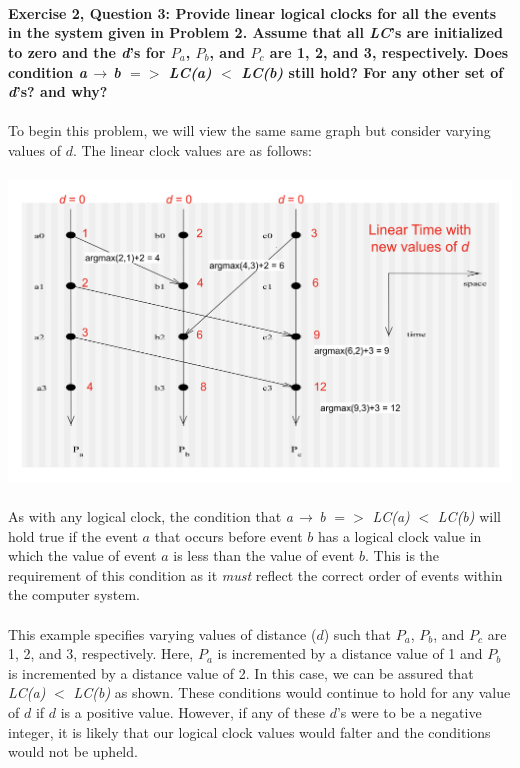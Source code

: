 \documentclass{article}
\begin{document}
\\ \\ \\
\textbf{Exercise 2, Question 3: Provide linear logical clocks for all the events in the system given in Problem 2. Assume that all \textit{LC}'s are initialized to zero and the \textit{d}'s for \textit{$P_a$}, \textit{$P_b$}, and \textit{$P_c$} are 1, 2, and 3, respectively. Does condition \textit{a}$\,\to\,$\textit{b} $=>$ \textit{LC(a)} $<$ \textit{LC(b)} still hold? For any other set of \textit{d}'s? and why?} \\ \\ 
To begin this problem, we will view the same same graph but consider varying values of $d$. The linear clock values are as follows: \\ \\
\includegraphics[width=\textwidth,height=\textheight,keepaspectratio]{new_d.png}\\ \\
As with any logical clock, the condition that \textit{a}$\,\to\,$\textit{b} $=>$ \textit{LC(a)} $<$ \textit{LC(b)} will hold true if the event $a$ that occurs before event $b$ has a logical clock value in which the value of event $a$ is less than the value of event $b$. This is the requirement of this condition as it \textit{must} reflect the correct order of events within the computer system.\\ \\
This example specifies varying values of distance ($d$) such that \textit{$P_a$}, \textit{$P_b$}, and \textit{$P_c$} are 1, 2, and 3, respectively. Here, \textit{$P_a$} is incremented by a distance value of 1 and \textit{$P_b$} is incremented by a distance value of 2. In this case, we can be assured that \textit{LC(a)} $<$ \textit{LC(b)} as shown. These conditions would continue to hold for any value of $d$ if $d$ is a positive value. However, if any of these $d$'s were to be a negative integer, it is likely that our logical clock values would falter and the conditions would not be upheld. 
\end{document}
